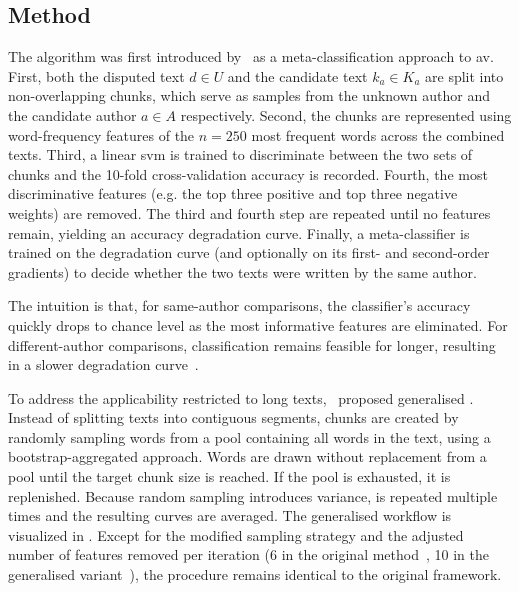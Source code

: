 \subsection{\unmasking{} Method}
\label{subsec:unmasking}

The \unmasking{} algorithm was first introduced by \citet{koppel_authorship_2004}\ as a meta-classification approach to \ac{av}. 
First, both the disputed text $d \in U$ and the candidate text $k_a \in K_a$ are split into non-overlapping chunks, which serve as samples from the unknown author and the candidate author $a \in A$ respectively. 
Second, the chunks are represented using word-frequency features of the $n=250$ most frequent words across the combined texts.
Third, a linear \ac{svm} is trained to discriminate between the two sets of chunks and the 10-fold cross-validation accuracy is recorded.
Fourth, the most discriminative features (e.g. the top three positive and top three negative weights) are removed.  
The third and fourth step are repeated until no features remain, yielding an accuracy degradation curve.  
Finally, a meta-classifier is trained on the degradation curve (and optionally on its first- and second-order gradients) to decide whether the two texts were written by the same author.  

The intuition is that, for same-author comparisons, the classifier’s accuracy quickly drops to chance level as the most informative features are eliminated. 
For different-author comparisons, classification remains feasible for longer, resulting in a slower degradation curve~\citep{stein_intrinsic_2011,tyo_state_2022,bevendorff_divergence_based_2020,stamatatos_survey_2009}. 

To address the applicability restricted to long texts, \citet{bevendorff_generalizing_2019,bevendorff_divergence_based_2020}\ proposed generalised \unmasking{}. 
Instead of splitting texts into contiguous segments, chunks are created by randomly sampling words from a pool containing all words in the text, using a bootstrap-aggregated approach.
Words are drawn without replacement from a pool until the target chunk size is reached.
If the pool is exhausted, it is replenished. 
Because random sampling introduces variance, \unmasking{} is repeated multiple times and the resulting curves are averaged. 
The generalised \unmasking{} workflow is visualized in . 
Except for the modified sampling strategy and the adjusted number of features removed per iteration (6 in the original method~\citep{koppel_authorship_2004}, 10 in the generalised variant~\citep{bevendorff_generalizing_2019}), the procedure remains identical to the original \unmasking{} framework.

